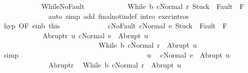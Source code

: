 \begin{isabellebody}
\ \ \ \ \ \ \ \ \ \ \isamarkupfalse%
\ WhileNoFault\isanewline
\ \ \ \ \ \ \ \ \ \ \isamarkupfalse%
\ {\isachardoublequoteopen}{\isasymGamma}{\isasymturnstile}{\isasymlangle}While\ b\ c{\isacharcomma}Normal\ r{\isasymrangle}\ {\isasymRightarrow}{\isasymnotin}{\isacharparenleft}{\isacharbraceleft}Stuck{\isacharbraceright}\ {\isasymunion}\ Fault\ {\isacharbackquote}\ {\isacharparenleft}{\isacharminus}F{\isacharparenright}{\isacharparenright}{\isachardoublequoteclose}\isanewline
\ \ \ \ \ \ \ \ \ \ \ \ \isamarkupfalse%
\ {\isacharparenleft}auto\ simp\ add{\isacharcolon}\ final{\isacharunderscore}notin{\isacharunderscore}def\ intro{\isacharcolon}\ exec{\isachardot}intros{\isacharparenright}\isanewline
\ \ \ \ \ \ \ \ \ \ \isamarkupfalse%
\ hyp\ {\isacharbrackleft}OF\ e{\isacharunderscore}in{\isacharunderscore}b\ this{\isacharbrackright}\ \isamarkupfalse%
\isanewline
\ \ \ \ \ \ \ \ \ \ \ \ cNoFault{\isacharcolon}\ {\isachardoublequoteopen}{\isasymGamma}{\isasymturnstile}{\isasymlangle}c{\isacharcomma}Normal\ e{\isasymrangle}\ {\isasymRightarrow}{\isasymnotin}{\isacharparenleft}{\isacharbraceleft}Stuck{\isacharbraceright}\ {\isasymunion}\ Fault\ {\isacharbackquote}\ {\isacharparenleft}{\isacharminus}F{\isacharparenright}{\isacharparenright}{\isachardoublequoteclose}\ \isanewline
\ \ \ \ \ \ \ \ \ \ \ \ Abrupt{\isacharunderscore}r{\isacharcolon}\ {\isachardoublequoteopen}{\isasymforall}u{\isachardot}\ {\isasymGamma}{\isasymturnstile}{\isasymlangle}c{\isacharcomma}Normal\ e{\isasymrangle}\ {\isasymRightarrow}\ Abrupt\ u\ {\isasymlongrightarrow}\ \isanewline
\ \ \ \ \ \ \ \ \ \ \ \ \ \ \ \ \ \ \ \ \ \ \ \ \ \ \ \ {\isasymGamma}{\isasymturnstile}{\isasymlangle}While\ b\ c{\isacharcomma}Normal\ r{\isasymrangle}\ {\isasymRightarrow}\ Abrupt\ u{\isachardoublequoteclose}\isanewline
\ \ \ \ \ \ \ \ \ \ \ \ \isamarkupfalse%
\ simp\isanewline
\ \ \ \ \ \ \ \ \ \ \isanewline
\ \ \ \ \ \ \ \ \ \ \ \isacommand{{\isacharbraceleft}}\isamarkupfalse%
\isanewline
\ \ \ \ \ \ \ \ \ \ \ \ \isamarkupfalse%
\ u\ \isamarkupfalse%
\ {\isachardoublequoteopen}{\isasymGamma}{\isasymturnstile}{\isasymlangle}c{\isacharcomma}Normal\ e{\isasymrangle}\ {\isasymRightarrow}\ Abrupt\ u{\isachardoublequoteclose}\isanewline
\ \ \ \ \ \ \ \ \ \ \ \ \isamarkupfalse%
\ Abrupt{\isacharunderscore}r\ \isamarkupfalse%
\ {\isachardoublequoteopen}{\isasymGamma}{\isasymturnstile}{\isasymlangle}While\ b\ c{\isacharcomma}Normal\ r{\isasymrangle}\ {\isasymRightarrow}\ Abrupt\ u{\isachardoublequoteclose}\ \isamarkupfalse%

\end{isabellebody}
